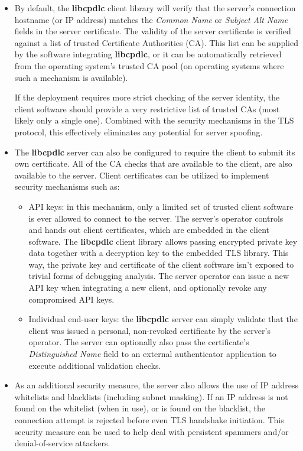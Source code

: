 \documentclass[a4paper,12pt]{article}
\newcommand{\libcpdlc}{\textbf{libcpdlc}\xspace}
\begin{document}
\begin{itemize}

\item By default, the \libcpdlc client library will verify that the
server's connection hostname (or IP address) matches the {\em Common
Name} or {\em Subject Alt Name} fields in the server certificate. The
validity of the server certificate is verified against a list of trusted
Certificate Authorities (CA). This list can be supplied by the software
integrating \libcpdlc, or it can be automatically retrieved from the
operating system's trusted CA pool (on operating systems where such a
mechanism is available).

If the deployment requires more strict checking of the server identity,
the client software should provide a very restrictive list of trusted CAs
(most likely only a single one). Combined with the security mechanisms in
the TLS protocol, this effectively eliminates any potential for server
spoofing.

\item The \libcpdlc server can also be configured to require the client
to submit its own certificate. All of the CA checks that are available to
the client, are also available to the server. Client certificates can be
utilized to implement security mechanisms such as:

\begin{itemize}

\item API keys: in this mechanism, only a limited set of trusted client
software is ever allowed to connect to the server. The server's operator
controls and hands out client certificates, which are embedded in the
client software. The \libcpdlc client library allows passing encrypted
private key data together with a decryption key to the embedded TLS
library. This way, the private key and certificate of the client software
isn't exposed to trivial forms of debugging analysis. The server operator
can issue a new API key when integrating a new client, and optionally
revoke any compromised API keys.

\item Individual end-user keys: the \libcpdlc server can simply validate
that the client was issued a personal, non-revoked certificate by the
server's operator. The server can optionally also pass the certificate's
{\em Distinguished Name} field to an external authenticator application
to execute additional validation checks.

\end{itemize}

\item As an additional security measure, the server also allows the
use of IP address whitelists and blacklists (including subnet masking).
If an IP address is not found on the whitelist (when in use), or is found
on the blacklist, the connection attempt is rejected before even TLS
handshake initiation. This security measure can be used to help deal with
persistent spammers and/or denial-of-service attackers.

\end{itemize}
\end{document}
